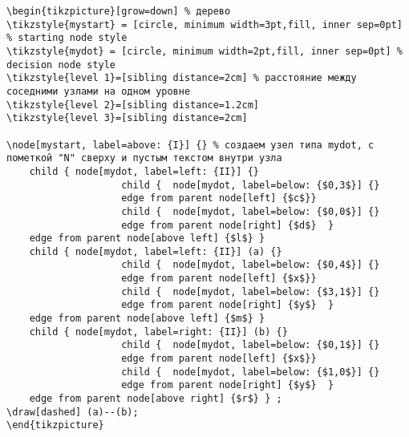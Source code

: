 \documentclass[12pt,a4paper]{article}
\begin{document}
\begin{verbatim}
\begin{tikzpicture}[grow=down] % дерево
\tikzstyle{mystart} = [circle, minimum width=3pt,fill, inner sep=0pt] % starting node style
\tikzstyle{mydot} = [circle, minimum width=2pt,fill, inner sep=0pt] % decision node style
\tikzstyle{level 1}=[sibling distance=2cm] % расстояние между соседними узлами на одном уровне
\tikzstyle{level 2}=[sibling distance=1.2cm]
\tikzstyle{level 3}=[sibling distance=2cm]

\node[mystart, label=above: {I}] {} % создаем узел типа mydot, с пометкой "N" сверху и пустым текстом внутри узла
    child { node[mydot, label=left: {II}] {}
                    child {  node[mydot, label=below: {$0,3$}] {}
                    edge from parent node[left] {$c$}}
                    child {  node[mydot, label=below: {$0,0$}] {}
                    edge from parent node[right] {$d$}  }
    edge from parent node[above left] {$l$} }
    child { node[mydot, label=left: {II}] (a) {}
                    child {  node[mydot, label=below: {$0,4$}] {}
                    edge from parent node[left] {$x$}}
                    child {  node[mydot, label=below: {$3,1$}] {}
                    edge from parent node[right] {$y$}  }
    edge from parent node[above left] {$m$} }
    child { node[mydot, label=right: {II}] (b) {}
                    child {  node[mydot, label=below: {$0,1$}] {}
                    edge from parent node[left] {$x$}}
                    child {  node[mydot, label=below: {$1,0$}] {}
                    edge from parent node[right] {$y$}  }
    edge from parent node[above right] {$r$} } ;
\draw[dashed] (a)--(b);
\end{tikzpicture}
        
\end{verbatim}


\newpage
{}
\end{document}
